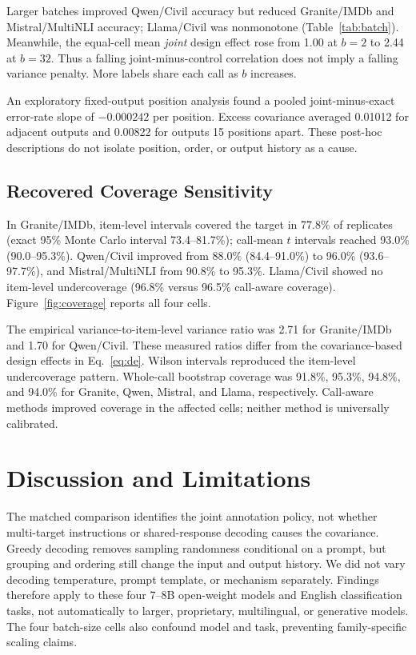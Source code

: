 \documentclass[conference]{IEEEtran}
\begin{document}
Larger batches improved Qwen/Civil accuracy but reduced Granite/IMDb and Mistral/MultiNLI accuracy; Llama/Civil was nonmonotone (Table~\ref{tab:batch}). Meanwhile, the equal-cell mean \emph{joint} design effect rose from 1.00 at $b=2$ to 2.44 at $b=32$. Thus a falling joint-minus-control correlation does not imply a falling variance penalty. More labels share each call as $b$ increases.

An exploratory fixed-output position analysis found a pooled joint-minus-exact error-rate slope of $-0.000242$ per position. Excess covariance averaged 0.01012 for adjacent outputs and 0.00822 for outputs 15 positions apart. These post-hoc descriptions do not isolate position, order, or output history as a cause.

\subsection{Recovered Coverage Sensitivity}
In Granite/IMDb, item-level intervals covered the target in 77.8\% of replicates (exact 95\% Monte Carlo interval 73.4--81.7\%); call-mean $t$ intervals reached 93.0\% (90.0--95.3\%). Qwen/Civil improved from 88.0\% (84.4--91.0\%) to 96.0\% (93.6--97.7\%), and Mistral/MultiNLI from 90.8\% to 95.3\%. Llama/Civil showed no item-level undercoverage (96.8\% versus 96.5\% call-aware coverage). Figure~\ref{fig:coverage} reports all four cells.

The empirical variance-to-item-level variance ratio was 2.71 for Granite/IMDb and 1.70 for Qwen/Civil. These measured ratios differ from the covariance-based design effects in Eq.~\ref{eq:de}. Wilson intervals reproduced the item-level undercoverage pattern. Whole-call bootstrap coverage was 91.8\%, 95.3\%, 94.8\%, and 94.0\% for Granite, Qwen, Mistral, and Llama, respectively. Call-aware methods improved coverage in the affected cells; neither method is universally calibrated.

\section{Discussion and Limitations}
The matched comparison identifies the joint annotation policy, not whether multi-target instructions or shared-response decoding causes the covariance. Greedy decoding removes sampling randomness conditional on a prompt, but grouping and ordering still change the input and output history. We did not vary decoding temperature, prompt template, or mechanism separately. Findings therefore apply to these four 7--8B open-weight models and English classification tasks, not automatically to larger, proprietary, multilingual, or generative models. The four batch-size cells also confound model and task, preventing family-specific scaling claims.
\end{document}

